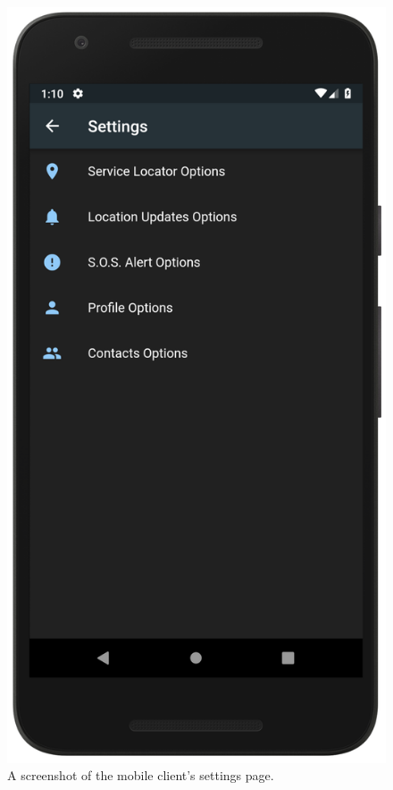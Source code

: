 \documentclass[10pt, a4paper]{article}
\begin{document}
\begin{figure}[H]
\endminipage\hfill
{}%
  \includegraphics[width=\linewidth]{demo_settings.png}
  \caption{A screenshot of the mobile client's settings page.}\label{fig:mobile3}
\endminipage
\end{figure}
\end{document}
